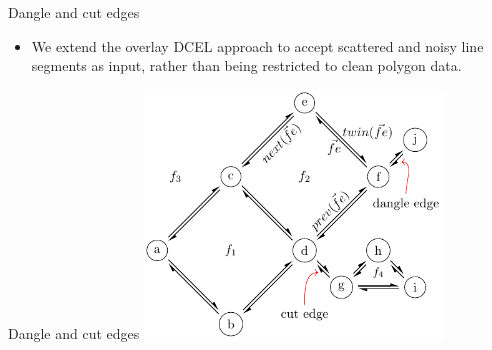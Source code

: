 \begin{frame}{Dangle and cut edges}
    \begin{itemize}
        \item We extend the overlay DCEL approach to accept scattered and noisy line segments as input, rather than being restricted to clean polygon data.
    \end{itemize}
\end{frame}


\begin{frame}{Dangle and cut edges}
    \centering
    \includegraphics[width=0.6\textwidth]{../thesis/chapterExtension/dcel_example2}
\end{frame}

